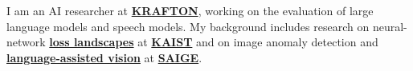 \documentclass[11pt, a4paper]{cv}
\begin{document}
\makecvheader


\vspace{3mm}
\color{sectiondivider}\vhrulefill{.7pt}

\begin{cvparagraph}
\raggedright
{}
I am an AI researcher at \href{https://www.krafton.com/}{\textbf{KRAFTON}}, working on the evaluation of large language models and speech models.
My background includes research on neural-network \href{https://arxiv.org/abs/2306.11304}{\textbf{loss landscapes}} at \href{https://www.kaist.ac.kr/en/}{\textbf{KAIST}} and on image anomaly detection and \href{https://arxiv.org/abs/2503.01184}{\textbf{language-assisted vision}} at \href{https://saige.ai/en/}{\textbf{SAIGE}}.
\end{cvparagraph}
\end{document}
